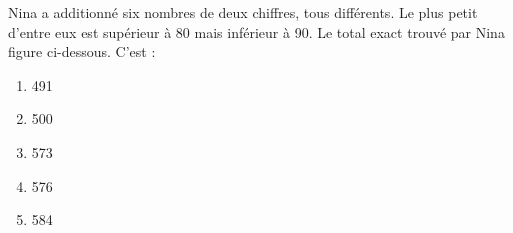 Nina a additionné six nombres de deux chiffres, tous différents. Le
plus petit d'entre eux est supérieur à 80 mais inférieur à 90. Le
total exact trouvé par Nina figure ci-dessous. C'est :
\begin{multicols}{5}
  \begin{enumerate}[A/]
  \item 491
  \item 500
  \item 573
  \item 576
  \item 584
  \end{enumerate}
\end{multicols}